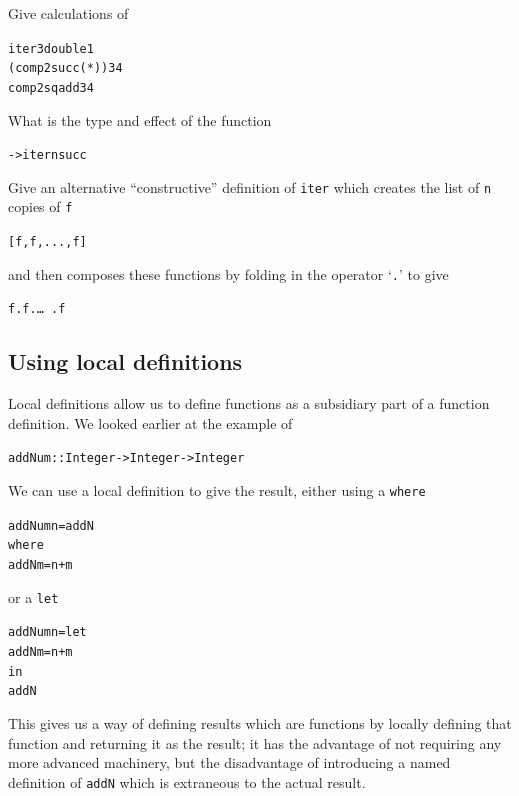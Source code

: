 \begin{exercises}

\item
Give calculations of
\begin{alltt}
{\hskip1pc}iter 3 double 1
(comp2 succ (*)) 3 4
comp2 sq add 3 4
\end{alltt}

\item
What is the type and effect of the function
\begin{alltt}
 -> iter n succ
\end{alltt}

\item 
Give an alternative ``constructive'' definition of \texttt{iter} which creates the list of \texttt{n} copies of \texttt{f}
\begin{alltt}
[f,f,...,f]
\end{alltt} and then composes these functions by folding in the
operator `\texttt{.}' to give 
\begin{alltt}
f . f . \ldots\ . f
\end{alltt}



\end{exercises}

\subsection*{Using local definitions}

Local definitions allow us to define functions as a subsidiary part of a function definition. We looked earlier at the example of 
\begin{alltt}
addNum :: Integer -> Integer -> Integer
\end{alltt}
We can use a local definition to give the result, either using a \texttt{where}
\begin{alltt}
addNum n = addN
		   where
		   addN m = n+m
\end{alltt}
or a \texttt{let}
\begin{alltt}
addNum n = let 
             addN m = n+m
           in
             addN
\end{alltt}
This gives us a way of defining results which are functions by locally defining that function and returning it as the result; it has the advantage of not requiring any more advanced machinery, but the disadvantage of introducing a named definition of \texttt{addN} which is extraneous to the actual result. 		   

